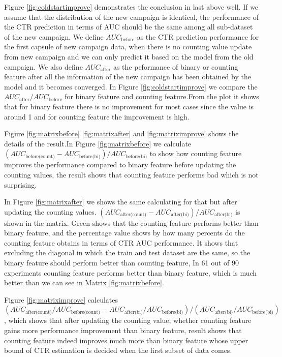 Figure \ref{fig:coldstartimprove} demonstrates the conclusion in last above well. If we assume that the distribution of the new campaign is identical, the performance of the CTR prediction in terms of AUC should be the same among all sub-dataset of the new campaign. We define  \(AUC_{\text{before}}\) as the CTR prediction performance for the first capsule of new campaign data, when there is no counting value update from new campaign and we can only predict it based on the model from the old campaign. We also define \(AUC_{\text{after}}\) as the peformance of binary or counting feature after all the information of the new campaign has been obtained by the model and it becomes converged. In Figure \ref{fig:coldstartimprove} we compare the\({AUC_{\text{after}}}/{AUC_{\text{before}}}\)
for binary feature and counting feature.From the plot it shows that for binary feature there is no improvement for most cases since the value is around 1 and for counting feature the improvement is high. 



Figure \ref{fig:matrixbefore} \ref{fig:matrixafter} and \ref{fig:matriximprove} shows the details of the result.In Figure \ref{fig:matrixbefore} we calculate \((AUC_{\text{before(count)}} - AUC_{\text{before(bi)}}) / AUC_{\text{before(bi)}} \) to show how counting feature improves the performance compared to binary feature before updating the counting values, the result shows that counting feature performs bad which is not surprising. 

In Figure \ref{fig:matrixafter} we shows the same calculating for that but after updating the counting values.  \((AUC_{\text{after(count)}} - AUC_{\text{after(bi)}}) / AUC_{\text{after(bi)}} \) is shown in the matrix. Green shows that the counting feature performs better than binary feature, and the percentage value shows by how many percents do the counting feature obtains in terms of CTR AUC performance. It shows that excluding the diagonal in which the train and test dataset are the same, so the binary feature should perform better than counting feature, In 61 out of 90 experiments counting feature performs better than binary feature, which is much better than we can see in Matrix \ref{fig:matrixbefore}.

Figure \ref{fig:matriximprove} calculates 
\((AUC_{\text{after(count)}}/AUC_{\text{before(count)}} -AUC_{\text{after(bi)}}/AUC_{\text{before(bi)}})  / (AUC_{\text{after(bi)}}/AUC_{\text{before(bi)}})  \), which shows that after updating the counting value, whether counting feature gains more performance improvement than binary feature, result shows that counting feature indeed improves much more than binary feature whose upper bound of CTR estimation is decided when the first subset of data comes. 

